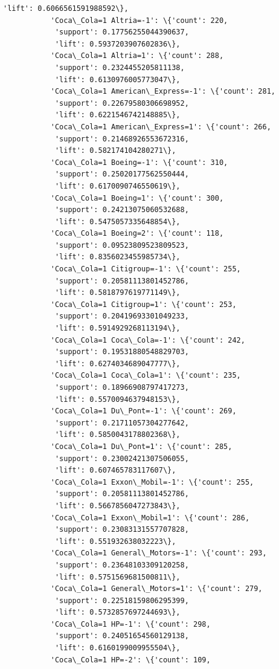 \documentclass[11pt]{article}
\begin{document}
\begin{Verbatim}[commandchars=\\\{\}]
            'lift': 0.6066561591988592\},
           'Coca\_Cola=1 Altria=-1': \{'count': 220,
            'support': 0.17756255044390637,
            'lift': 0.5937203907602836\},
           'Coca\_Cola=1 Altria=1': \{'count': 288,
            'support': 0.2324455205811138,
            'lift': 0.6130976005773047\},
           'Coca\_Cola=1 American\_Express=-1': \{'count': 281,
            'support': 0.22679580306698952,
            'lift': 0.6221546742148885\},
           'Coca\_Cola=1 American\_Express=1': \{'count': 266,
            'support': 0.21468926553672316,
            'lift': 0.582174104280271\},
           'Coca\_Cola=1 Boeing=-1': \{'count': 310,
            'support': 0.25020177562550444,
            'lift': 0.6170090746550619\},
           'Coca\_Cola=1 Boeing=1': \{'count': 300,
            'support': 0.24213075060532688,
            'lift': 0.5475057335648854\},
           'Coca\_Cola=1 Boeing=2': \{'count': 118,
            'support': 0.09523809523809523,
            'lift': 0.8356023455985734\},
           'Coca\_Cola=1 Citigroup=-1': \{'count': 255,
            'support': 0.20581113801452786,
            'lift': 0.5818797619771149\},
           'Coca\_Cola=1 Citigroup=1': \{'count': 253,
            'support': 0.20419693301049233,
            'lift': 0.5914929268113194\},
           'Coca\_Cola=1 Coca\_Cola=-1': \{'count': 242,
            'support': 0.19531880548829703,
            'lift': 0.6274034689047777\},
           'Coca\_Cola=1 Coca\_Cola=1': \{'count': 235,
            'support': 0.18966908797417273,
            'lift': 0.5570094637948153\},
           'Coca\_Cola=1 Du\_Pont=-1': \{'count': 269,
            'support': 0.21711057304277642,
            'lift': 0.5850043178802368\},
           'Coca\_Cola=1 Du\_Pont=1': \{'count': 285,
            'support': 0.23002421307506055,
            'lift': 0.607465783117607\},
           'Coca\_Cola=1 Exxon\_Mobil=-1': \{'count': 255,
            'support': 0.20581113801452786,
            'lift': 0.5667856047273843\},
           'Coca\_Cola=1 Exxon\_Mobil=1': \{'count': 286,
            'support': 0.23083131557707828,
            'lift': 0.551932638032223\},
           'Coca\_Cola=1 General\_Motors=-1': \{'count': 293,
            'support': 0.23648103309120258,
            'lift': 0.5751569681500811\},
           'Coca\_Cola=1 General\_Motors=1': \{'count': 279,
            'support': 0.22518159806295399,
            'lift': 0.5732857697244693\},
           'Coca\_Cola=1 HP=-1': \{'count': 298,
            'support': 0.24051654560129138,
            'lift': 0.6160199009955504\},
           'Coca\_Cola=1 HP=-2': \{'count': 109,

\end{Verbatim}
\end{document}

